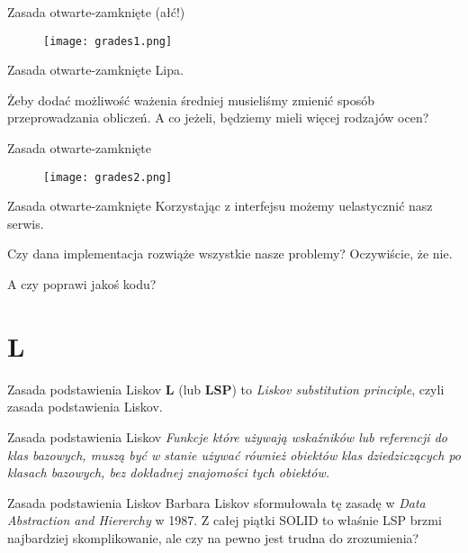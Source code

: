 \begin{frame}{Zasada otwarte-zamknięte (ałć!)}
	\begin{figure} \centering
		\texttt{[image: grades1.png]}
	\end{figure}
\end{frame}

\begin{frame}{Zasada otwarte-zamknięte}
	Lipa.
	
	Żeby dodać możliwość ważenia średniej musieliśmy zmienić sposób przeprowadzania obliczeń. A co jeżeli, będziemy mieli więcej rodzajów ocen?
\end{frame}

\begin{frame}{Zasada otwarte-zamknięte}
	\begin{figure} \centering
		\texttt{[image: grades2.png]}
	\end{figure}
\end{frame}

\begin{frame}{Zasada otwarte-zamknięte}
	Korzystając z interfejsu możemy uelastycznić nasz serwis.
	
	Czy dana implementacja rozwiąże wszystkie nasze problemy? Oczywiście, że nie.
	
	A czy poprawi jakoś kodu?
\end{frame}

\section{L}

\begin{frame}{Zasada podstawienia Liskov}
	\textbf{L} (lub \textbf{LSP}) to \emph{Liskov substitution principle}, czyli zasada podstawienia Liskov.
\end{frame}

\begin{frame}{Zasada podstawienia Liskov}
	\emph{Funkcje które używają wskaźników lub referencji do klas bazowych, muszą być w stanie używać również obiektów klas dziedziczących po klasach bazowych, bez dokładnej znajomości tych obiektów.}
\end{frame}

\begin{frame}{Zasada podstawienia Liskov}
	Barbara Liskov sformułowała tę zasadę w \emph{Data Abstraction and Hiererchy} w 1987. Z całej piątki SOLID to właśnie LSP brzmi najbardziej skomplikowanie, ale czy na pewno jest trudna do zrozumienia?
\end{frame}

